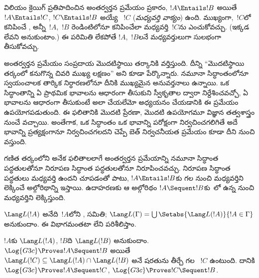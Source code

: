 \documentclass[../../../include/open-logic-section]{subfiles}
\begin{document}


విలియం క్రెయిగ్ ప్రతిపాదించిన అంతర్వర్తన ప్రమేయం ప్రకారం, $!A
\Entails !B$ అయితే $!A \Entails !C$, $!C \Entails !B$ అయ్యే ~$!C$ (\emph{మధ్యవర్తి వాక్యం}) ఉంది. ముఖ్యంగా,~$!C$లో కనిపించే ,  అన్నీ~$!A$,~$!B$ రెండింటిలోనూ కనిపించేలా మధ్యవర్తి~$!C$ను ఎంచుకోవచ్చు. (ఇక్కడ  లేవని అనుకుంటాం.) ఈ పరిమితి లేకపోతే $!A$,~$!B$లనే మధ్యవర్తులుగా సులభంగా తీసుకోవచ్చు.

అంతర్వర్తన ప్రమేయం సంప్రదాయ మొదటిస్థాయి తర్కానికి వర్తిస్తుంది. దీన్ని “మొదటిస్థాయి తర్కంలో కనుగొన్న చివరి ముఖ్య లక్షణం” అని కూడా పేర్కొన్నారు. నమూనా సిద్ధాంతంలోనూ స్వయంచాలక తార్కిక నిర్ధారణలోనూ దీనికి ముఖ్యమైన అనువర్తనాలు ఉన్నాయి. ఒక సిద్ధాంతాన్ని ఏ ప్రాథమిక భావాలను ఆధారంగా తీసుకుని స్వీకృతాల ద్వారా నిర్దేశించవచ్చో, ఏ భావాలను ఆధారంగా తీసుకుంటే అలా చేయలేమో అధ్యయనం చేయడానికి ఈ ప్రమేయం ఉపయోగపడుతుంది. ఈ ఫలితానికి మొదటి ప్రేరణా, మొదటి ఉపయోగమూ విజ్ఞాన తత్వశాస్త్రం నుంచే వచ్చాయి. అంతేగాక, ఒక సిద్ధాంతం ఒక భావాన్ని పరోక్షంగా నిర్వచించగలిగితే అదే భావాన్ని ప్రత్యక్షంగానూ నిర్వచించగలదని చెప్పే బెత్ నిర్వచనీయత ప్రమేయం కూడా దీని నుంచి వస్తుంది.

గణిత తర్కంలోని అనేక ఫలితాలలాగే అంతర్వర్తన ప్రమేయాన్ని నమూనా సిద్ధాంత పద్ధతులతోనూ నిరూపణ సిద్ధాంత పద్ధతులతోనూ నిరూపించవచ్చు. నిరూపణ సిద్ధాంత పద్ధతులు మధ్యవర్తి ఉందని చూపడంతో పాటు, $!A \Entails !B$కు గల  నుంచి మధ్యవర్తిని లెక్కించే అల్గోరిథాన్ని ఇస్తాయి. ఉదాహరణకు ఆ అల్గోరిథం $!A \Sequent !B$కు~లో ఉన్న  నుంచి మధ్యవర్తిని లెక్కిస్తుంది.

$\Lang L(!A)$ అనేది~$!A$లోని ,  సమితి; $\Lang L(\Gamma) = \bigcup \Setabs{\Lang L(!A)}{!A \in
\Gamma}$ అనుకుందాం. ఈ విభాగమంతటా  లేని  పరిశీలిస్తాం.

\begin{thm}[క్రెయిగ్ అంతర్వర్తన ప్రమేయం]
$!A$కు  $\Lang L(!A)$, $!B$ది $\Lang L(!B)$ అనుకుందాం. $\Log{G3c} \Proves !A \Sequent !B$ అయితే $\Lang L(!C) \subseteq \Lang
L(!A) \cap \Lang L(!B)$ అనే షరతును తీర్చే  గల ~$!C$ ఉంటుంది. దానికి $\Log{G3c} \Proves !A \Sequent !C$, $\Log{G3c} \Proves !C \Sequent !B$.
\end{thm}
\end{document}
